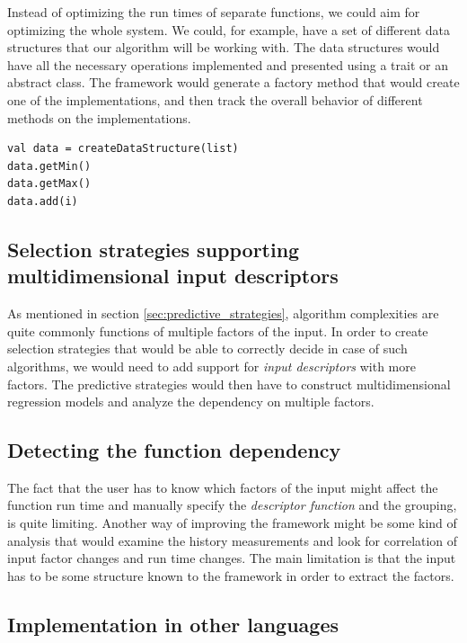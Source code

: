 Instead of optimizing the run times of separate functions, we could aim for optimizing the whole system. We could, for example, have a set of different data structures that our algorithm will be working with. The data structures would have all the necessary operations implemented and presented using a trait or an abstract class. The framework would generate a factory method that would create one of the implementations, and then track the overall behavior of different methods on the implementations. 

\lstset{style=Scala}
\begin{lstlisting}
val data = createDataStructure(list)
data.getMin()
data.getMax()
data.add(i)
\end{lstlisting}

\subsection{Selection strategies supporting multidimensional input descriptors}

As mentioned in section \ref{sec:predictive_strategies}, algorithm complexities are quite commonly functions of multiple factors of the input. In order to create selection strategies that would be able to correctly decide in case of such algorithms, we would need to add support for \textit{input descriptors} with more factors. The predictive strategies would then have to construct multidimensional regression models and analyze the dependency on multiple factors.

\subsection{Detecting the function dependency}

The fact that the user has to know which factors of the input might affect the function run time and manually specify the \textit{descriptor function} and the grouping, is quite limiting. Another way of improving the framework might be some kind of analysis that would examine the history measurements and look for correlation of input factor changes and run time changes. The main limitation is that the input has to be some structure known to the framework in order to extract the factors.

\subsection{Implementation in other languages}

